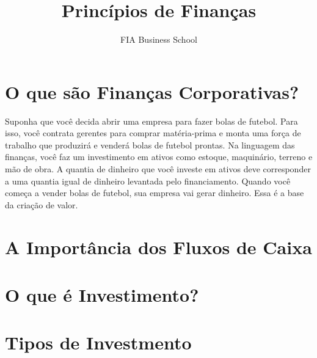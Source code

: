 \documentclass{article}\usepackage[]{graphicx}\usepackage[]{xcolor}
\title{Princípios de Finanças}
\author{FIA Business School}
\begin{document}
\maketitle

\section*{O que são Finanças Corporativas?}

Suponha que você decida abrir uma empresa para fazer bolas de futebol. Para isso, você contrata 
gerentes para comprar matéria-prima e monta uma força de trabalho que produzirá e venderá bolas 
de futebol prontas. Na linguagem das finanças, você faz um investimento em ativos como estoque, 
maquinário, terreno e mão de obra. A quantia de dinheiro que você investe em ativos deve 
corresponder a uma quantia igual de dinheiro levantada pelo financiamento. Quando você começa a 
vender bolas de futebol, sua empresa vai gerar dinheiro. Essa é a base da criação de valor. 

\section*{A Importância dos Fluxos de Caixa}

\section*{O que é Investimento?}

\section*{Tipos de Investmento}
\end{document}
